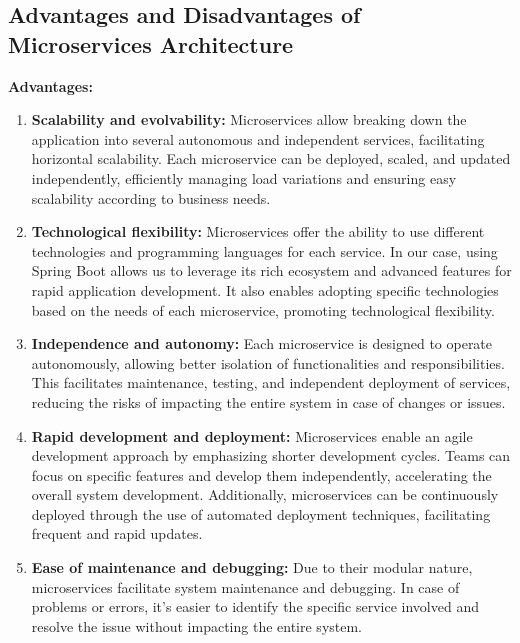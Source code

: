 \subsection{Advantages and Disadvantages of Microservices Architecture}
\textbf{Advantages:}
\begin{enumerate}
\item \textbf{Scalability and evolvability:} Microservices allow breaking down the application into several autonomous and independent services, facilitating horizontal scalability. Each microservice can be deployed, scaled, and updated independently, efficiently managing load variations and ensuring easy scalability according to business needs.
\item \textbf{Technological flexibility:} Microservices offer the ability to use different technologies and programming languages for each service. In our case, using Spring Boot allows us to leverage its rich ecosystem and advanced features for rapid application development. It also enables adopting specific technologies based on the needs of each microservice, promoting technological flexibility.
\item \textbf{Independence and autonomy:} Each microservice is designed to operate autonomously, allowing better isolation of functionalities and responsibilities. This facilitates maintenance, testing, and independent deployment of services, reducing the risks of impacting the entire system in case of changes or issues.
\item \textbf{Rapid development and deployment:} Microservices enable an agile development approach by emphasizing shorter development cycles. Teams can focus on specific features and develop them independently, accelerating the overall system development. Additionally, microservices can be continuously deployed through the use of automated deployment techniques, facilitating frequent and rapid updates.
\item \textbf{Ease of maintenance and debugging:} Due to their modular nature, microservices facilitate system maintenance and debugging. In case of problems or errors, it's easier to identify the specific service involved and resolve the issue without impacting the entire system.
\end{enumerate}

